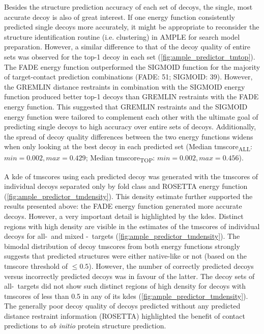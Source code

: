 Besides the structure prediction accuracy of each set of decoys, the single, most accurate decoy is also of great interest. If one energy function consistently predicted single decoys more accurately, it might be appropriate to reconsider the structure identification routine (i.e. clustering) in AMPLE for search model preparation. However, a similar difference to that of the decoy quality of entire sets was observed for the top-1 decoy in each set (\cref{fig:ample_predictor_tmtop}). The FADE energy function outperformed the SIGMOID function for the majority of target-contact prediction combinations (FADE: 51; SIGMOID: 39). However, the GREMLIN distance restraints in combination with the SIGMOID energy function produced better top-1 decoys than GREMLIN restraints with the FADE energy function. This suggested that GREMLIN restraints and the SIGMOID energy function were tailored to complement each other with the ultimate goal of predicting single decoys to high accuracy over entire sets of decoys. Additionally, the spread of decoy quality differences between the two energy functions widens when only looking at the best decoy in each predicted set (\textDelta Median \gls{tmscore}\textsubscript{ALL}: $min=0.002, max=0.429$; \textDelta Median \gls{tmscore}\textsubscript{TOP}: $min=0.002, max=0.456$). 

A \gls{kde} of \gls{tmscore}s using each predicted decoy was generated with the \gls{tmscore}s of individual decoys separated only by fold class and ROSETTA energy function (\cref{fig:ample_predictor_tmdensity}). This density estimate further supported the results presented above: the FADE energy function generated more accurate decoys. However, a very important detail is highlighted by the \gls{kde}s. Distinct regions with high density are visible in the estimates of the \gls{tmscore}s of individual decoys for all-\textalpha\ and mixed \textalpha-\textbeta\ targets (\cref{fig:ample_predictor_tmdensity}). The bimodal distribution of decoy \gls{tmscore}s from both energy functions strongly suggests that predicted structures were either native-like or not (based on the \gls{tmscore} threshold of $\leq0.5$). However, the number of correctly predicted decoys versus incorrectly predicted decoys was in favour of the latter. The decoy sets of all-\textbeta\ targets did not show such distinct regions of high density for decoys with \gls{tmscore}s of less than 0.5 in any of its \gls{kde}s (\cref{fig:ample_predictor_tmdensity}). The generally poor decoy quality of decoys predicted without any predicted distance restraint information (ROSETTA) highlighted the benefit of contact predictions to \textit{ab initio} protein structure prediction.

